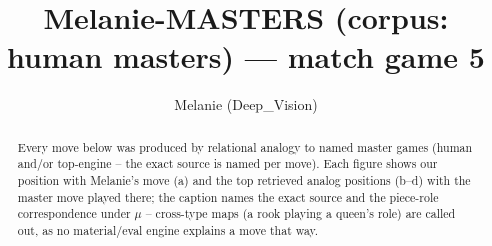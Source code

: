 \documentclass[11pt]{article}
\title{Melanie-MASTERS (corpus: human masters) — match game 5}
\author{Melanie (Deep\_Vision)}
\date{}
\begin{document}
\maketitle

\begin{abstract}Every move below was produced by relational analogy to named master games (human and/or top-engine -- the exact source is named per move). Each figure shows our position with Melanie's move (a) and the top retrieved analog positions (b--d) with the master move played there; the caption names the exact source and the piece-role correspondence under $\mu$ -- cross-type maps (a rook playing a queen's role) are called out, as no material/eval engine explains a move that way.\end{abstract}

\begin{figure}[p]\centering
\begin{subfigure}{0.46\textwidth}\centering
\resizebox{\linewidth}{!}{%
\newchessgame
\chessboard[
  setfen={r1bq1rk1/pppp1ppp/3n1b2/4R3/8/2N5/PPPP1PPP/R1BQ1BK1 w - - 3 10},
  showmover=false,
  pgfstyle=straightmove, color=movearrow, markmove={e5-e1}
]}
\caption{}
\end{subfigure}\hfill
\begin{subfigure}{0.46\textwidth}\centering
\resizebox{\linewidth}{!}{%
\newchessgame
\chessboard[
  setfen={r1bqnrk1/pppp1ppp/5b2/4R3/2PP4/8/PP3PPP/RNBQ1BK1 w - - 1 11},
  showmover=false,
  pgfstyle=straightmove, color=movearrow, markmove={e5-e1}
]}
\caption{}
\end{subfigure}
\\[4pt]
\begin{subfigure}{0.46\textwidth}\centering
\resizebox{\linewidth}{!}{%
\newchessgame
\chessboard[
  setfen={r1bqnrk1/pppp1ppp/5b2/4R3/2PP4/8/PP3PPP/RNBQ1BK1 w - - 1 11},
  showmover=false,
  pgfstyle=straightmove, color=movearrow, markmove={e5-e1}
]}
\caption{}
\end{subfigure}\hfill
\begin{subfigure}{0.46\textwidth}\centering
\resizebox{\linewidth}{!}{%
\newchessgame
\chessboard[
  setfen={r1bqnrk1/pppp1ppp/5b2/4R3/2PP4/8/PP3PPP/RNBQ1BK1 w - - 1 11},
  showmover=false,
  pgfstyle=straightmove, color=movearrow, markmove={e5-e1}
]}
\caption{}
\end{subfigure}

\end{figure}
\end{document}
